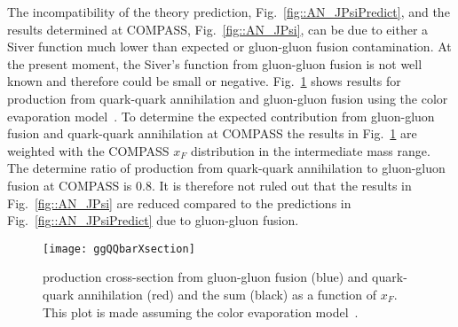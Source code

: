 The incompatibility of the theory prediction, Fig.~\ref{fig::AN_JPsiPredict},
and the results determined at COMPASS, Fig.~\ref{fig::AN_JPsi}, can be due to
either a Siver function much lower than expected or gluon-gluon fusion
contamination.  At the present moment, the Siver's function from gluon-gluon
fusion is not well known and therefore could be small or negative.
Fig.~\ref{fig::ggQQbarXsection} shows results for {\jp} production from
quark-quark annihilation and gluon-gluon fusion using the color evaporation
model~\cite{VOGT1999197}.  To determine the expected {\jp} contribution from
gluon-gluon fusion and quark-quark annihilation at COMPASS the results in
Fig.~\ref{fig::ggQQbarXsection} are weighted with the COMPASS $x_F$ distribution
in the intermediate mass range.  The determine ratio of {\jp} production from
quark-quark annihilation to gluon-gluon fusion at COMPASS is 0.8.  It is
therefore not ruled out that the results in Fig.~\ref{fig::AN_JPsi} are reduced
compared to the predictions in Fig.~\ref{fig::AN_JPsiPredict} due to gluon-gluon
fusion.

\begin{figure}[h!t]
  \centering \texttt{[image: ggQQbarXsection]}
  \caption{{\jp} production cross-section from gluon-gluon fusion (blue) and
    quark-quark annihilation (red) and the sum (black) as a function of $x_F$.
    This plot is made assuming the color evaporation model~\cite{VOGT1999197}. }
  \label{fig::ggQQbarXsection}
\end{figure}
